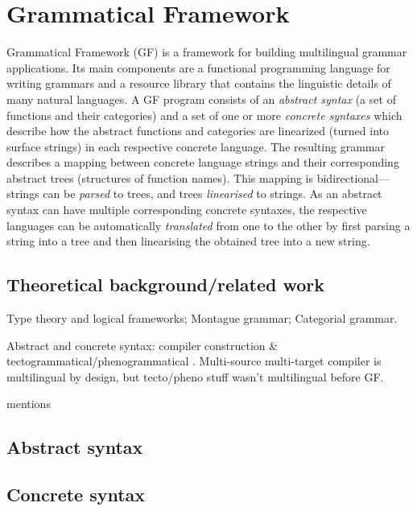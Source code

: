 \section{Grammatical Framework}
\label{sec:gf-intro}

Grammatical Framework (GF) \cite{ranta2011gfbook} 
is a framework for building multilingual grammar applications. Its main
components are a functional programming language for writing grammars
and a resource library that contains the linguistic details of many
natural languages.
A GF program consists of an \emph{abstract syntax} (a set of functions
and their categories) and a set of one or more
\emph{concrete syntaxes} which describe how the abstract
functions and categories are linearized (turned into surface strings) in each
respective concrete language. The resulting grammar
describes a mapping between concrete language strings and
their corresponding abstract trees (structures of function names).
This mapping is bidirectional---strings can be \emph{parsed} to
trees, and trees \emph{linearised} to strings.
As an abstract syntax can have multiple corresponding concrete syntaxes,
the respective languages can be automatically \emph{translated} from one to the other by
first parsing a string into a tree and then linearising the obtained tree
into a new string.

\subsection{Theoretical background/related work}

Type theory and logical frameworks; Montague grammar; Categorial grammar.

Abstract and concrete syntax: compiler construction \& tectogrammatical/phenogrammatical . Multi-source multi-target compiler is multilingual by design, but tecto/pheno stuff wasn't multilingual before GF.

\cite{ranta2011gfbook} mentions 


\subsection{Abstract syntax}

\subsection{Concrete syntax}
